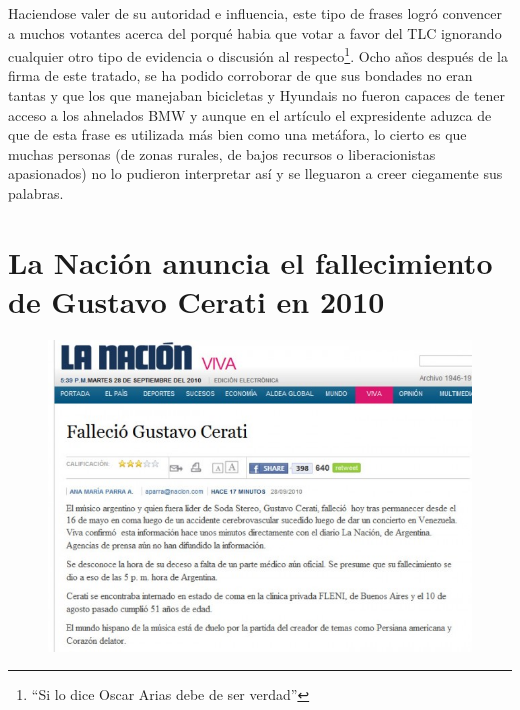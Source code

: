 \documentclass[times]{simauth}
\begin{document}
Haciendose valer de su autoridad e influencia, este tipo de frases logró convencer a muchos votantes acerca del porqué habia que votar a favor del TLC ignorando cualquier otro tipo de evidencia o discusión al respecto\footnote{``Si lo dice Oscar Arias debe de ser verdad''}. Ocho años después de la firma de este tratado, se ha podido corroborar de que sus bondades no eran tantas y que los que manejaban bicicletas y Hyundais no fueron capaces de tener acceso a los ahnelados BMW y aunque en el artículo el expresidente aduzca de que de esta frase es utilizada más bien como una metáfora, lo cierto es que muchas personas (de zonas rurales, de bajos recursos o liberacionistas apasionados) no lo pudieron interpretar así y se lleguaron a creer ciegamente sus palabras.


\newpage
\section{La Nación anuncia el fallecimiento de Gustavo Cerati en 2010 }

\begin{figure}[h!]
    \centering
    \includegraphics[width=14cm]{fallece-cerati}
    \label{fig:falacia10}
\end{figure}
\end{document}
